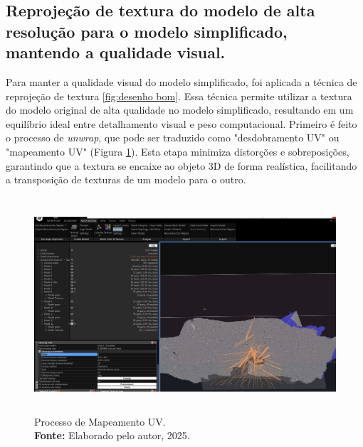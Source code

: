   \subsection{Reprojeção de textura do modelo de alta resolução para o modelo simplificado, mantendo a qualidade visual.} 
  
Para manter a qualidade visual do modelo simplificado, foi aplicada a técnica de reprojeção de textura \ref{fig:desenho bom}. Essa técnica permite utilizar a textura do modelo original de alta qualidade no modelo simplificado, resultando em um equilíbrio ideal entre detalhamento visual e peso computacional. Primeiro é feito o processo de \textit{unwrap}, que pode ser traduzido como "desdobramento UV" ou "mapeamento UV" (Figura \ref{fig:unwrap}). Esta etapa minimiza distorções e sobreposições, garantindo que a textura se encaixe ao objeto 3D de forma realística, facilitando a transposição de texturas de um modelo para o outro. 
\begin{figure}[H]
        \centering
        \includegraphics[height=8cm, keepaspectratio]{img/reality e fotogrametria processo/unwrap.png}
        \caption{Processo de Mapeamento UV. \\
            \textbf{Fonte:} Elaborado pelo autor, 2025.}
        \label{fig:unwrap}
\end{figure}

